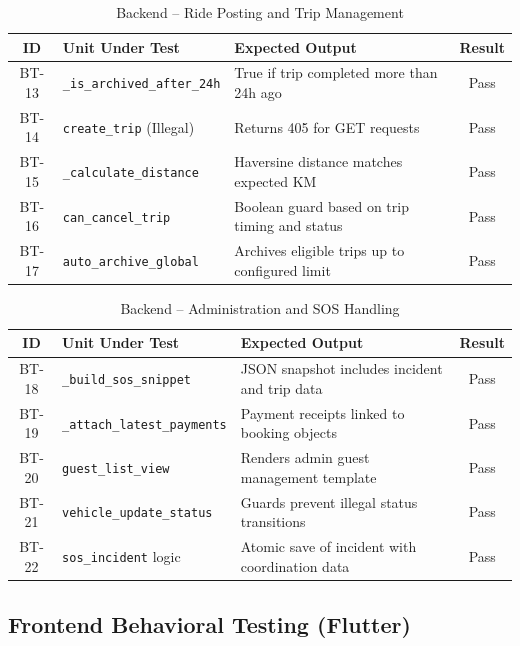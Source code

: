 \begin{table}[H]
\centering
\caption{Backend – Ride Posting and Trip Management}
\renewcommand{\arraystretch}{1.3}
\begin{tabularx}{\textwidth}{|c|X|X|c|}
\hline
\textbf{ID} & \textbf{Unit Under Test} & \textbf{Expected Output} & \textbf{Result} \\
\hline
BT-13 & \texttt{\_is\_archived\_after\_24h} & True if trip completed more than 24h ago & Pass \\
\hline
BT-14 & \texttt{create\_trip} (Illegal) & Returns 405 for GET requests & Pass \\
\hline
BT-15 & \texttt{\_calculate\_distance} & Haversine distance matches expected KM & Pass \\
\hline
BT-16 & \texttt{can\_cancel\_trip} & Boolean guard based on trip timing and status & Pass \\
\hline
BT-17 & \texttt{auto\_archive\_global} & Archives eligible trips up to configured limit & Pass \\
\hline
\end{tabularx}
\end{table}

\begin{table}[H]
\centering
\caption{Backend – Administration and SOS Handling}
\renewcommand{\arraystretch}{1.3}
\begin{tabularx}{\textwidth}{|c|X|X|c|}
\hline
\textbf{ID} & \textbf{Unit Under Test} & \textbf{Expected Output} & \textbf{Result} \\
\hline
BT-18 & \texttt{\_build\_sos\_snippet} & JSON snapshot includes incident and trip data & Pass \\
\hline
BT-19 & \texttt{\_attach\_latest\_payments} & Payment receipts linked to booking objects & Pass \\
\hline
BT-20 & \texttt{guest\_list\_view} & Renders admin guest management template & Pass \\
\hline
BT-21 & \texttt{vehicle\_update\_status} & Guards prevent illegal status transitions & Pass \\
\hline
BT-22 & \texttt{sos\_incident} logic & Atomic save of incident with coordination data & Pass \\
\hline
\end{tabularx}
\end{table}

\subsection{Frontend Behavioral Testing (Flutter)}

